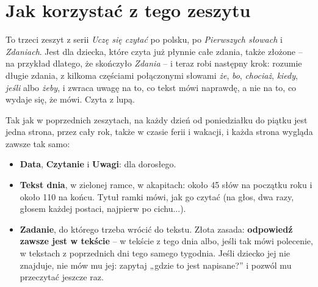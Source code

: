 \section*{Jak korzystać z tego zeszytu}

To trzeci zeszyt z serii \emph{Uczę się czytać} po polsku, po
\emph{Pierwszych słowach} i \emph{Zdaniach}. Jest dla dziecka, które
czyta już płynnie całe zdania, także złożone -- na przykład dlatego, że
skończyło \emph{Zdania} -- i teraz robi następny krok: rozumie długie
zdania, z kilkoma częściami połączonymi słowami \textit{że},
\textit{bo}, \textit{chociaż}, \textit{kiedy}, \textit{jeśli} albo
\textit{żeby}, i zwraca uwagę na to, co tekst mówi naprawdę, a nie na
to, co wydaje się, że mówi. Czyta z lupą.

Tak jak w poprzednich zeszytach, na każdy dzień od poniedziałku do
piątku jest jedna strona, przez cały rok, także w czasie ferii i
wakacji, i każda strona wygląda zawsze tak samo:

\begin{itemize}[leftmargin=6mm, itemsep=1mm]
\item \textbf{Data}, \textbf{Czytanie} i \textbf{Uwagi}: dla dorosłego.
\item \textbf{Tekst dnia}, w zielonej ramce, w akapitach: około 45 słów
  na początku roku i około 110 na końcu. Tytuł ramki mówi, jak go czytać
  (na głos, dwa razy, głosem każdej postaci, najpierw po cichu...).
\item \textbf{Zadanie}, do którego trzeba wrócić do tekstu. Złota
  zasada: \textbf{odpowiedź zawsze jest w tekście} -- w tekście z tego
  dnia albo, jeśli tak mówi polecenie, w tekstach z poprzednich dni tego
  samego tygodnia. Jeśli dziecko jej nie znajduje, nie mów mu jej:
  zapytaj „gdzie to jest napisane?” i pozwól mu przeczytać jeszcze raz.
\end{itemize}

